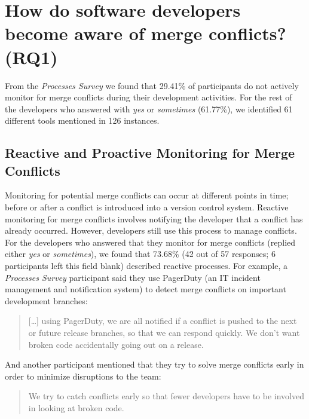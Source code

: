 
\section{How do software developers become \textbf{aware} of merge conflicts? (RQ1)}\label{RQ1}

From the \textit{Processes Survey} we found that 29.41\% of participants do not actively monitor for merge conflicts during their development activities.
For the rest of the developers who answered with \emph{yes} or \emph{sometimes} (61.77\%), we identified 61 different tools mentioned in 126 instances.

\subsection{Reactive and Proactive Monitoring for Merge Conflicts}


Monitoring for potential merge conflicts can occur at different points in time; before or after a conflict is introduced into a version control system.
Reactive monitoring for merge conflicts involves notifying the developer that a conflict has already occurred.
However, developers still use this process to manage conflicts.
For the developers who answered that they monitor for merge conflicts (replied either \emph{yes} or \emph{sometimes}), we found that 73.68\% (42 out of 57 responses; 6 participants left this field blank) described reactive processes.
For example, a \textit{Processes Survey} participant said they use PagerDuty (an IT incident management and notification system) to detect merge conflicts on important development branches:
\begin{quotation}
	[\ldots] using PagerDuty, we are all notified if a conflict is pushed to the next or future release branches, so that we can respond quickly. We don't want broken code accidentally going out on a release.
\end{quotation}
And another participant mentioned that they try to solve merge conflicts early in order to minimize disruptions to the team:
\begin{quotation}
	We try to catch conflicts early so that fewer developers have to be involved in looking at broken code.
\end{quotation}

